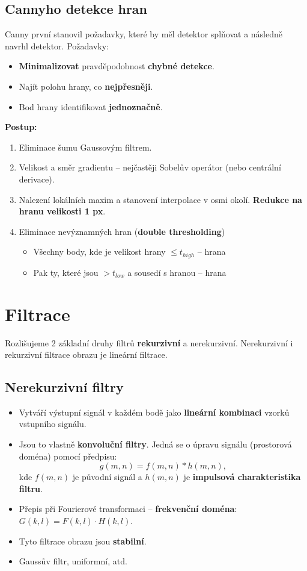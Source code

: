 \subsection{Cannyho detekce hran}
Canny první stanovil požadavky, které by měl detektor splňovat a následně navrhl detektor. %
Požadavky:
\begin{itemize}
    \item \textbf{Minimalizovat} pravděpodobnost \textbf{chybné detekce}.
    \item Najít polohu hrany, co \textbf{nejpřesněji}.
    \item Bod hrany identifikovat \textbf{jednoznačně}.
\end{itemize}
\textbf{Postup:}
\begin{enumerate}
    \item Eliminace šumu Gaussovým filtrem.
    \item Velikost a směr gradientu -- nejčastěji Sobelův operátor (nebo centrální derivace).
    \item Nalezení lokálních maxim a stanovení interpolace v osmi okolí. \textbf{Redukce na hranu velikosti 1 px}.
    \item Eliminace nevýznamných hran (\textbf{double thresholding})
          \begin{itemize}
              \item Všechny body, kde je velikost hrany $\leq t_{high}$ --  hrana
              \item Pak ty, které jsou $ > t_{low}$ a sousedí s hranou --  hrana
          \end{itemize}
\end{enumerate}

\section{Filtrace}
Rozlišujeme 2 základní druhy filtrů \textbf{rekurzivní} a nerekurzivní. Nerekurzivní i rekurzivní filtrace obrazu je lineární filtrace.

\subsection{Nerekurzivní filtry}
\begin{itemize}
    \item Vytváří výstupní signál v každém bodě jako \textbf{lineární kombinaci} vzorků vstupního signálu.
    \item Jsou to vlastně \textbf{konvoluční filtry}. Jedná se o úpravu signálu (prostorová doména) pomocí předpisu:
          \begin{equation*}
              g(m , n) = f(m, n) * h(m ,n),
          \end{equation*}
          kde $ f(m,n) $ je původní signál a $ h(m,n) $ je \textbf{impulsová charakteristika filtru}.
    \item Přepis při Fourierové transformaci -- \textbf{frekvenční doména}: $G(k ,l)=F(k ,l) \cdot H (k ,l)$.
    \item Tyto filtrace obrazu jsou \textbf{stabilní}.
    \item Gaussův filtr, uniformní, atd.
\end{itemize}

